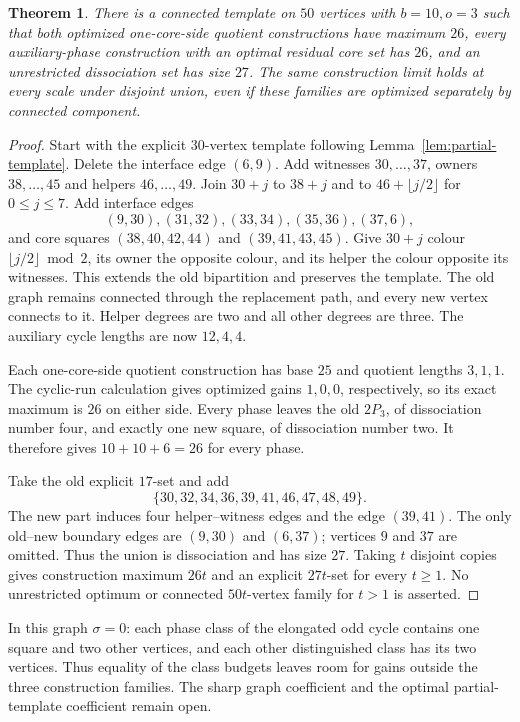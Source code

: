 \documentclass[11pt]{article}
\newtheorem{theorem}{Theorem}
\begin{document}
\begin{theorem}\label{thm:construction-ceiling}
There is a connected template on $50$ vertices with $b=10,o=3$ such
that both optimized one-core-side quotient constructions have maximum
$26$, every auxiliary-phase construction with an optimal residual core
set has $26$, and an unrestricted dissociation set has size $27$.
The same construction limit holds at every scale under disjoint union,
even if these families are optimized separately by connected component.
\end{theorem}
\begin{proof}
Start with the explicit $30$-vertex template following
Lemma~\ref{lem:partial-template}. Delete the interface edge $(6,9)$.
Add witnesses $30,\ldots,37$, owners $38,\ldots,45$ and helpers
$46,\ldots,49$. Join $30+j$ to $38+j$ and to $46+\lfloor j/2\rfloor$
for $0\le j\le7$. Add interface edges
\[
 (9,30),(31,32),(33,34),(35,36),(37,6),
\]
and core squares $(38,40,42,44)$ and $(39,41,43,45)$.
Give $30+j$ colour $\lfloor j/2\rfloor\bmod2$, its owner the opposite
colour, and its helper the colour opposite its witnesses. This extends
the old bipartition and preserves the template. The old graph remains
connected through the replacement path, and every new vertex connects
to it. Helper degrees are two and all other degrees are three.
The auxiliary cycle lengths are now $12,4,4$.

Each one-core-side quotient construction has base $25$ and quotient
lengths $3,1,1$. The cyclic-run calculation gives optimized gains
$1,0,0$, respectively, so its exact maximum is $26$ on either side.
Every phase leaves the old $2P_3$, of dissociation number four, and
exactly one new square, of dissociation number two. It therefore gives
$10+10+6=26$ for every phase.

Take the old explicit $17$-set and add
\[
 \{30,32,34,36,39,41,46,47,48,49\}.
\]
The new part induces four helper--witness edges and the edge $(39,41)$.
The only old--new boundary edges are $(9,30)$ and $(6,37)$; vertices
$9$ and $37$ are omitted. Thus the union is dissociation and has size
$27$. Taking $t$ disjoint copies gives construction maximum $26t$ and
an explicit $27t$-set for every $t\ge1$. No unrestricted optimum or
connected $50t$-vertex family for $t>1$ is asserted.
\end{proof}

In this graph $\sigma=0$: each phase class of the elongated odd cycle
contains one square and two other vertices, and each other distinguished
class has its two vertices. Thus equality of the class budgets leaves
room for gains outside the three construction families. The sharp graph
coefficient and the optimal partial-template coefficient remain open.
\end{document}
